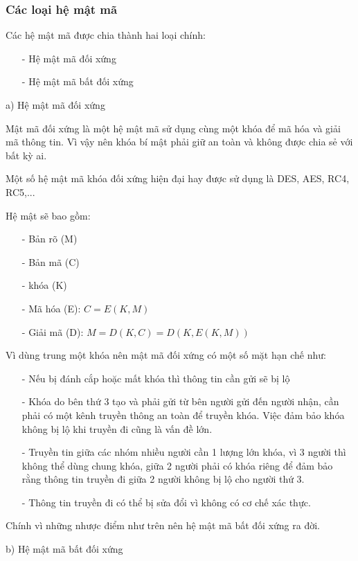 \subsubsection{Các loại hệ mật mã}
Các hệ mật mã được chia thành hai loại chính: 
\begin{itemize}
    \item[-] Hệ mật mã đối xứng
    \item[-] Hệ mật mã bất đối xứng
\end{itemize}

a) Hệ mật mã đối xứng

Mật mã đối xứng là một hệ mật mã sử dụng cùng một khóa để mã hóa và giải mã thông tin.
Vì vậy nên khóa bí mật phải giữ an toàn và không được chia sẻ với bất kỳ ai.

Một số hệ mật mã khóa đối xứng hiện đại hay được sử dụng là DES, AES, RC4, RC5,...

Hệ mật sẽ bao gồm:
\begin{itemize}
    \item[-] Bản rõ (M)
    \item[-] Bản mã (C)
    \item[-] khóa (K)
    \item[-] Mã hóa (E): $C = E(K,M)$
    \item[-] Giải mã (D): $M = D(K,C) = D(K,E(K,M))$
\end{itemize}

Vì dùng trung một khóa nên mật mã đối xứng có một số mặt hạn chế như:
\begin{itemize}
    \item[-] Nếu bị đánh cắp hoặc mất khóa thì thông tin cần gửi sẽ bị lộ
    \item[-] Khóa do bên thứ 3 tạo và phải gửi từ bên người gửi đến người nhận, 
    cần phải có một kênh truyền thông an toàn để truyền khóa. Việc đảm bảo khóa 
    không bị lộ khi truyền đi cũng là vấn đề lớn.
    \item[-] Truyền tin giữa các nhóm nhiều người cần 1 lượng lớn khóa, vì 3 người 
    thì không thể dùng chung khóa, giữa 2 người phải có khóa riêng để đảm bảo rằng
    thông tin truyền đi giữa 2 người không bị lộ cho người thứ 3.
    \item[-] Thông tin truyền đi có thể bị sửa đổi vì không có cơ chế xác thực.    
\end{itemize}

Chính vì những nhược điểm như trên nên hệ mật mã bất đối xứng ra đời.

b) Hệ mật mã bất đối xứng

